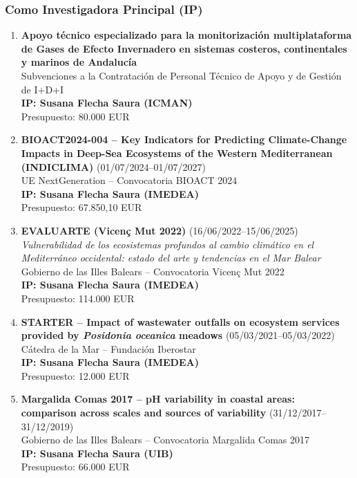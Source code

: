 \documentclass[11pt,a4paper]{article}
\begin{document}
\subsubsection{Como Investigadora Principal (IP)}

\begin{enumerate}[leftmargin=*]

    \item \textbf{Apoyo técnico especializado para la monitorización multiplataforma de Gases de Efecto Invernadero en sistemas costeros, continentales y marinos de Andalucía}\\
    Subvenciones a la Contratación de Personal Técnico de Apoyo y de Gestión de I+D+I\\
    \textbf{IP: Susana Flecha Saura (ICMAN)}\\
    Presupuesto: 80.000 EUR

    \item \textbf{BIOACT2024-004 -- Key Indicators for Predicting Climate-Change Impacts in Deep-Sea Ecosystems of the Western Mediterranean (INDICLIMA)} (01/07/2024--01/07/2027)\\
    UE NextGeneration -- Convocatoria BIOACT 2024\\
    \textbf{IP: Susana Flecha Saura (IMEDEA)}\\
    Presupuesto: 67.850,10 EUR

    \item \textbf{EVALUARTE (Vicenç Mut 2022)} (16/06/2022--15/06/2025)\\
    \textit{Vulnerabilidad de los ecosistemas profundos al cambio climático en el Mediterráneo occidental: estado del arte y tendencias en el Mar Balear}\\
    Gobierno de las Illes Balears -- Convocatoria Vicenç Mut 2022\\
    \textbf{IP: Susana Flecha Saura (IMEDEA)}\\
    Presupuesto: 114.000 EUR

    \item \textbf{STARTER -- Impact of wastewater outfalls on ecosystem services provided by \textit{Posidonia oceanica} meadows} (05/03/2021--05/03/2022)\\
    Cátedra de la Mar -- Fundación Iberostar\\
    \textbf{IP: Susana Flecha Saura (IMEDEA)}\\
    Presupuesto: 12.000 EUR

    \item \textbf{Margalida Comas 2017 -- pH variability in coastal areas: comparison across scales and sources of variability} (31/12/2017--31/12/2019)\\
    Gobierno de las Illes Balears -- Convocatoria Margalida Comas 2017\\
    \textbf{IP: Susana Flecha Saura (UIB)}\\
    Presupuesto: 66.000 EUR


\end{enumerate}
\end{document}
